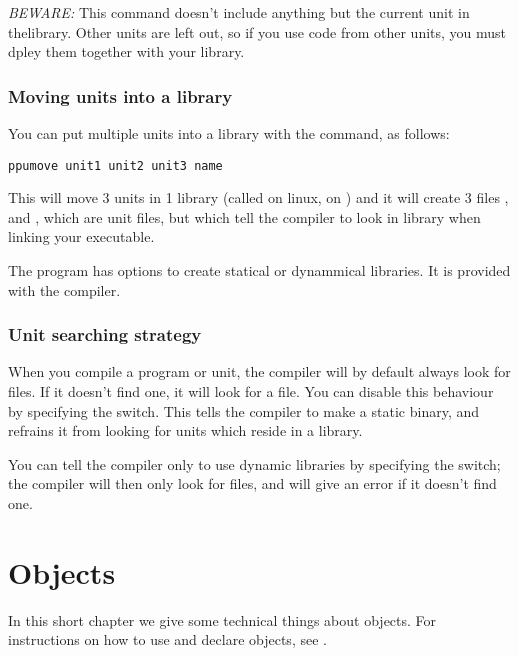 \documentclass{report}
\begin{document}
{\em BEWARE:} This command doesn't include anything but the current unit in
thelibrary. Other units are left out, so if you use code from other units,
you must dpley them together with your library.

\subsection{Moving units into a library}
You can put multiple units into a library with the  command, as
follows:

\begin{verbatim}
ppumove unit1 unit2 unit3 name
\end{verbatim}
This will move 3 units in 1 library (called  on linux,
 on \windows) and it will create 3 files ,
 and , which are unit files, but which tell
the compiler to look in library  when linking your executable.

The  program has options to create statical or dynammical
libraries. It is provided with the compiler.

\subsection{Unit searching strategy}

When you compile a program or unit, the compiler will by
default always look for  files. If it doesn't find one, it will
look for a  file. You can disable this behaviour by
specifying the  switch. This tells the compiler to make a static
binary, and refrains it from looking for units which reside in a library.

You can tell the compiler only to use dynamic libraries by specifying
the  switch; the compiler will then only look for  files,
and will give an error if it doesn't find one.

\chapter{Objects}
\label{ch:Objects}
In this short chapter we give some technical things about objects. For
instructions on how to use and declare objects, see .
\end{document}

